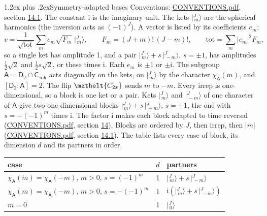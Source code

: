 \documentclass[10pt,a4paper]{article}
\makeatletter
\renewcommand\section{\@startsection{section}{1}{\z@}{-3ex plus -1ex minus -.2ex}%
  {1.2ex plus .2ex}{\normalfont\large\sffamily\bfseries\color{parttitle}}}
\numberwithin{equation}{section}
\newcommand{\eltfont}[1]{{\let\sigma\eltsigma\mathelt{#1}}}
\newcommand{\grp}[1]{\mathsf{#1}}
\newcommand{\elt}[1]{\eltfont{#1}}
\newcommand{\grpindex}[2]{[#1 : #2]}
\newcommand{\iunit}{\mathrm{i}}
\newcommand{\chiA}{\chi_{\grp{A}}}
\newcommand{\jm}[2]{\bigl\lvert{}^{#1}_{\,#2}\bigr\rangle}
\makeatother
\begin{document}
\section{Symmetry-adapted bases}\label{s:bases}
Conventions: \href{../../CONVENTIONS.pdf}{CONVENTIONS.pdf}, section \href{../../CONVENTIONS.pdf\#conv.14.1}{14.1}.
The constant $\iunit$ is the imaginary unit.
\leavevmode\label{n:index.m}\label{n:vector.ket}The kets $\jm{J}{m}$ are the spherical harmonics (the inversion acts as $(-1)^J$). \label{n:index.ketcoefficient}\label{n:vector.basis.symmetry}\label{n:index.ketweight}\label{n:index.total}A vector is listed by its coefficients $e_m$:
\begin{equation}\label{e:ket}v = \frac{1}{\sqrt{\mathrm{tot}}}\sum_m e_m\sqrt{F_m}\;\jm{J}{m},\qquad F_m = (J+m)!\,(J-m)!,\qquad \mathrm{tot} = \sum_m |e_m|^2F_m,\end{equation}
\leavevmode\label{n:index.pair.sign}so a single ket has amplitude 1, and a pair $\jm{J}{m} + s\,\jm{J}{-m}$, $s = \pm1$, has amplitudes $\tfrac{1}{2}\sqrt{2}$ and $\tfrac{1}{2}s\sqrt{2}$, or these times $\iunit$. Each $e_m$ is $\pm1$ or $\pm\iunit$.
\leavevmode\label{n:group.A}\label{n:function.character.abelian}The subgroup $\grp{A} = \grp{D_{2}}\cap\grp{C_{\infty h}}$ acts diagonally on the kets, on $\jm{J}{m}$ by the character $\chiA(m)$, and $\grpindex{\grp{D_{2}}}{\grp{A}} = 2$. The flip $\elt{C_{2x}}$ sends $m$ to $-m$. Every irrep is one-dimensional, so a block is one ket or a pair. Kets $\jm{J}{m}$ and $\jm{J}{-m}$ of one character of $\grp{A}$ give two one-dimensional blocks $\jm{J}{m} + s\,\jm{J}{-m}$, $s = \pm1$, the one with $s = -(-1)^m$ times $\iunit$. The factor $\iunit$ makes each block adapted to time reversal (\href{../../CONVENTIONS.pdf}{CONVENTIONS.pdf}, section \href{../../CONVENTIONS.pdf\#conv.14}{14}). Blocks are ordered by $J$, then irrep, then $|m|$ (\href{../../CONVENTIONS.pdf}{CONVENTIONS.pdf}, section \href{../../CONVENTIONS.pdf\#conv.14.1}{14.1}).
\leavevmode\label{n:head.case}\label{n:head.partners}The table lists every case of block, its dimension $d$ and its partners in order.
\begin{center}\begin{tabular}{@{}lrl@{}}\toprule
case & $d$ & partners\\\midrule
$\chiA(m) = \chiA(-m)$, $m > 0$, $s = (-1)^m$ & 1 & $\jm{J}{m} + s\,\jm{J}{-m}$\\
$\chiA(m) = \chiA(-m)$, $m > 0$, $s = -(-1)^m$ & 1 & $\iunit(\jm{J}{m} + s\,\jm{J}{-m})$\\
$m = 0$ & 1 & $\jm{J}{0}$\\
\bottomrule\end{tabular}\end{center}
\end{document}
